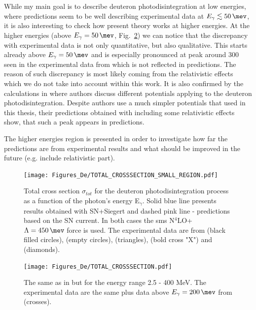     While my main goal is to describe deuteron photodisintegration at low energies, 
    where predictions seem to be well describing experimental data at
    $E_\gamma \lesssim \SI{50}{\mev}$, it is also interesting to check how 
    present theory works at higher energies.
    At the higher energies (above $E_\gamma=\SI{50}{\mev}$, Fig.~\ref{TOTAL_CROSS})
    we can notice that the discrepancy with experimental data is not only 
    quantitative, but also qualitative.  
    This starts already above $E_\gamma=\SI{50}{\mev}$ and is especially pronounced at peak around \SI{300}{\mev}
    seen in the experimental data from \cite{Bernabei1986} which is not
    reflected in predictions. The reason of such discrepancy 
    is most likely coming from the relativistic effects
    which we do not take into account within this work.
    It is also confirmed by the calculations in \cite{ArenhovelPhotodisint1991}
    where authors discuss different potentials applying to the deuteron photodisintegration.
    Despite authors use a much simpler potentials that used in this thesis, their predictions obtained with including
    some relativistic effects show, that such a peak appears in predictions. 
    
    
     The higher energies region is presented in order
    to investigate how far the predictions are from experimental results and 
    what should be improved in the future (e.g. include relativistic part). 
    
    \begin{figure}[h]
        \begin{center}
        \texttt{[image: Figures\_De/TOTAL\_CROSSSECTION\_SMALL\_REGION.pdf]}
        \end{center}
        \caption{Total cross section $\sigma_{tot}$ for the deuteron photodisintegration process
        as a function of the photon's energy E$_\gamma$.
        Solid blue line presents results obtained with SN+Siegert 
        and dashed pink line - predictions based on the SN current.
        In both cases the \gls{sms} N$^4$LO+ $\Lambda=\SI{450}{\mev}$ force is used.
        The experimental data are from \cite{Bernabei1986} (black filled circles),
        \cite{BOSMAN1979} (empty circles),
        \cite{Skopik1974} (triangles),
        \cite{Moreh1989} (bold cross "X") and
        \cite{Birenbaum1985} (diamonds).
        }
        \label{TOTAL_CROSS_small}
    \end{figure}

    
    \begin{figure}[htb!]
        \begin{center}
        \texttt{[image: Figures\_De/TOTAL\_CROSSSECTION.pdf]}
        \end{center}
        \caption{The same as in  but for the energy range 2.5 - 400 MeV.
        The experimental data are the same plus data above $E_\gamma=\SI{200}{\mev}$ from
        \cite{ARENDS1984} (crosses).
        }
        \label{TOTAL_CROSS}
    \end{figure}

